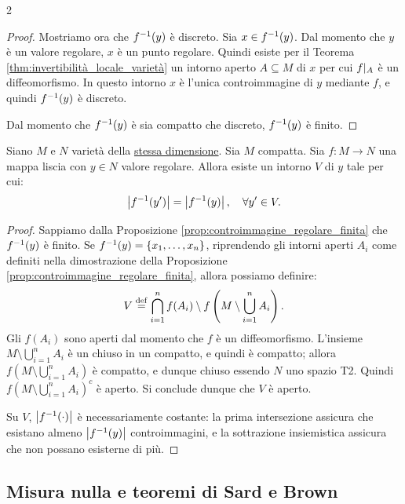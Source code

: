 \begin{multicols*}{2}
\begin{proof}
        Mostriamo ora che $f^{-1}(y)$ è discreto. Sia $x \in f^{-1}(y)$. Dal momento che $y$ è un valore regolare,
        $x$ è un punto regolare. Quindi esiste per il Teorema \ref{thm:invertibilità_locale_varietà} un
        intorno aperto $A \subseteq M$ di $x$ per cui $f\arrowvert_{A}$ è un diffeomorfismo. In questo intorno $x$
        è l'unica controimmagine di $y$ mediante $f$, e quindi $f^{-1}(y)$ è discreto. \smallskip

        Dal momento che $f^{-1}(y)$ è sia compatto che discreto, $f^{-1}(y)$ è finito.
    \end{proof}

    \begin{lemma} \label{lem:pila}
        Siano $M$ e $N$ varietà della \underline{stessa dimensione}.
        Sia $M$ compatta. Sia $f : M \to N$ una mappa liscia con $y \in N$ valore regolare.
        Allora esiste un intorno $V$ di $y$ tale per cui:
        \[
            \left\lvert f^{-1}(y') \right\rvert = \left\lvert f^{-1}(y) \right\rvert, \quad \forall y' \in V.
        \]
    \end{lemma}

    \begin{proof}
        Sappiamo dalla Proposizione \ref{prop:controimmagine_regolare_finita} che
        $f^{-1}(y)$ è finito. Se $f^{-1}(y) = \{x_1, \ldots, x_n\}$, riprendendo gli intorni aperti $A_i$
        come definiti nella dimostrazione della Proposizione \ref{prop:controimmagine_regolare_finita},
        allora possiamo definire:
        \[
            V \overset{\mathrm{def}}{=} \bigcap_{i = 1}^n f(A_i) \setminus f\left(M \setminus \bigcup_{i = 1}^n A_i\right).
        \]
        Gli $f(A_i)$ sono aperti dal momento che $f$ è un diffeomorfismo. L'insieme $M \setminus \bigcup_{i = 1}^n A_i$
        è un chiuso in un compatto, e quindi è compatto; allora $f\left(M \setminus \bigcup_{i = 1}^n A_i\right)$ è compatto,
        e dunque chiuso essendo $N$ uno spazio T2. Quindi $f\left(M \setminus \bigcup_{i = 1}^n A_i\right)^c$ è aperto.
        Si conclude dunque che $V$ è aperto. \smallskip

        Su $V$, $\left\lvert f^{-1}(\cdot) \right\rvert$ è necessariamente costante: la prima intersezione assicura che esistano
        almeno $\left\lvert f^{-1}(y) \right\rvert$ controimmagini, e la sottrazione insiemistica assicura che non possano esisterne di più.
    \end{proof}

    \subsection{Misura nulla e teoremi di Sard e Brown}


\end{multicols*}
